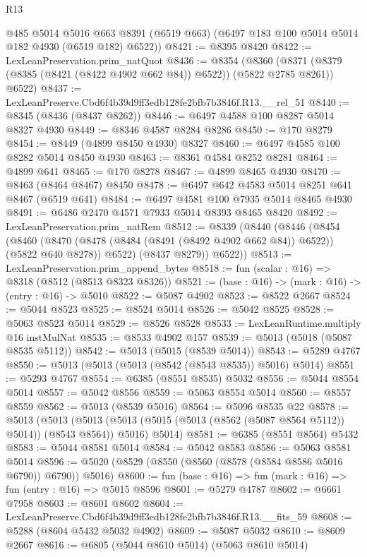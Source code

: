\begin{lexlean}{R13}
\begin{coremodule}
      @485
      @5014
      @5016
      @663
      @8391
      (@6519 @663)
      (@6497 @183 @100 @5014 @5014 @182 @4930 (@6519 @182) @6522))
@8421 := @8395 @8420
@8422 := LexLeanPreservation.prim_natQuot
@8436 := @8354
    (@8360 (@8371 (@8379 (@8385 (@8421 (@8422 @4902 @662 @84)) @6522)) (@5822 @2785 @8261)) @6522)
@8437 := LexLeanPreserve.Cbd6f4b39d9ff3edb128fe2bfb7b3846f.R13.__rel_51
@8440 := @8345 (@8436 (@8437 @8262))
@8446 := @6497 @4588 @100 @8287 @5014 @8327 @4930
@8449 := @8346 @4587 @8284 @8286
@8450 := @170 @8279
@8454 := @8449 (@4899 @8450 @4930) @8327
@8460 := @6497 @4585 @100 @8282 @5014 @8450 @4930
@8463 := @8361 @4584 @8252 @8281
@8464 := @4899 @641
@8465 := @170 @8278
@8467 := @4899 @8465 @4930
@8470 := @8463 (@8464 @8467) @8450
@8478 := @6497 @642 @4583 @5014 @8251 @641 @8467 (@6519 @641)
@8484 := @6497 @4581 @100 @7935 @5014 @8465 @4930
@8491 := @6486 @2470 @4571 @7933 @5014 @8393 @8465 @8420
@8492 := LexLeanPreservation.prim_natRem
@8512 := @8339
    (@8440
      (@8446
        (@8454
          (@8460
            (@8470 (@8478 (@8484 (@8491 (@8492 @4902 @662 @84)) @6522)) (@5822 @640 @8278))
            @6522)
          (@8437 @8279))
        @6522))
@8513 := LexLeanPreservation.prim_append_bytes
@8518 := fun (scalar : @16) => @8318 (@8512 (@8513 @8323 @8326))
@8521 := (base : @16) -> (mark : @16) -> (entry : @16) -> @5010
@8522 := @5087 @4902
@8523 := @8522 @2667
@8524 := @5044 @8523
@8525 := @8524 @5014
@8526 := @5042 @8525
@8528 := @5063 @8523 @5014
@8529 := @8526 @8528
@8533 := LexLeanRuntime.multiply @16 instMulNat
@8535 := @8533 @4902 @157
@8539 := @5013 (@5018 (@5087 @8535 @5112))
@8542 := @5013 (@5015 (@8539 @5014))
@8543 := @5289 @4767
@8550 := @5013 (@5013 (@5013 (@8542 (@8543 @8535)) @5016) @5014)
@8551 := @5293 @4767
@8554 := @6385 (@8551 @8535) @5032
@8556 := @5044 @8554 @5014
@8557 := @5042 @8556
@8559 := @5063 @8554 @5014
@8560 := @8557 @8559
@8562 := @5013 (@8539 @5016)
@8564 := @5096 @8535 @22
@8578 := @5013
    (@5013
      (@5013 (@5013 (@5015 (@5013 (@8562 (@5087 @8564 @5112)) @5014)) (@8543 @8564)) @5016)
      @5014)
@8581 := @6385 (@8551 @8564) @5432
@8583 := @5044 @8581 @5014
@8584 := @5042 @8583
@8586 := @5063 @8581 @5014
@8596 := @5020 (@8529 (@8550 (@8560 (@8578 (@8584 @8586 @5016 @6790)) @6790)) @5016)
@8600 := fun (base : @16) => fun (mark : @16) => fun (entry : @16) => @5015 @8596
@8601 := @5279 @4787
@8602 := @6661 @7958
@8603 := @8601 @8602
@8604 := LexLeanPreserve.Cbd6f4b39d9ff3edb128fe2bfb7b3846f.R13.__fits_59
@8608 := @5288 (@8604 @5432 @5032 @4902)
@8609 := @5087 @5032
@8610 := @8609 @2667
@8616 := @6805 (@5044 @8610 @5014) (@5063 @8610 @5014)

\end{coremodule}
\end{lexlean}
